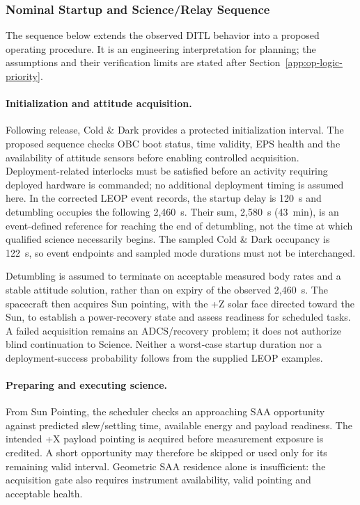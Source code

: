 \subsubsection{Nominal Startup and Science/Relay Sequence}\label{app:op-logic-diagram}
The sequence below extends the observed DITL behavior into a proposed operating procedure. It is an engineering interpretation for planning; the assumptions and their verification limits are stated after Section~\ref{app:op-logic-priority}.

\paragraph{Initialization and attitude acquisition.}
Following release, Cold \& Dark provides a protected initialization interval. The proposed sequence checks OBC boot status, time validity, EPS health and the availability of attitude sensors before enabling controlled acquisition. Deployment-related interlocks must be satisfied before an activity requiring deployed hardware is commanded; no additional deployment timing is assumed here. In the corrected LEOP event records, the startup delay is 120~s and detumbling occupies the following 2,460~s. Their sum, 2,580~s (43~min), is an event-defined reference for reaching the end of detumbling, not the time at which qualified science necessarily begins. The sampled Cold \& Dark occupancy is 122~s, so event endpoints and sampled mode durations must not be interchanged.

Detumbling is assumed to terminate on acceptable measured body rates and a stable attitude solution, rather than on expiry of the observed 2,460~s. The spacecraft then acquires Sun pointing, with the +Z solar face directed toward the Sun, to establish a power-recovery state and assess readiness for scheduled tasks. A failed acquisition remains an ADCS/recovery problem; it does not authorize blind continuation to Science. Neither a worst-case startup duration nor a deployment-success probability follows from the supplied LEOP examples.

\paragraph{Preparing and executing science.}
From Sun Pointing, the scheduler checks an approaching SAA opportunity against predicted slew/settling time, available energy and payload readiness. The intended +X payload pointing is acquired before measurement exposure is credited. A short opportunity may therefore be skipped or used only for its remaining valid interval. Geometric SAA residence alone is insufficient: the acquisition gate also requires instrument availability, valid pointing and acceptable health.

